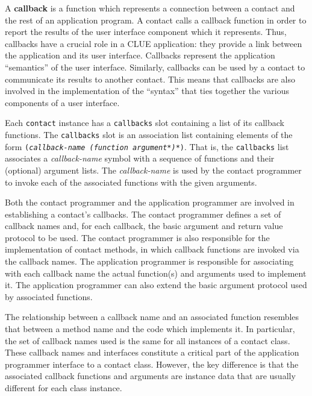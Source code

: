 
A {\bf callback} is a function which represents a connection
between a contact and the rest of an application program. A contact calls a
callback function in order to report the results of the user interface component
which it represents. Thus, callbacks have a crucial role in a CLUE application:
they provide a link between the application and its user interface. Callbacks
represent the application ``semantics'' of the user interface.
Similarly, callbacks can be used by a contact to communicate its results to
another contact. This means that callbacks are also involved in the
implementation of the ``syntax'' that ties together the various components of a
user interface. 

Each {\tt contact} instance has a {\tt callbacks} slot containing a list of its
callback functions.  The {\tt callbacks} slot is an association list containing
elements of the form 
{\tt ({\em callback-name (function argument*)*})}.
That is, the {\tt callbacks} list associates a {\em callback-name} symbol with a
sequence of functions and their (optional) argument lists.  The {\em
callback-name} is used by the contact programmer to invoke each of the
associated functions with the given arguments.

Both the contact programmer and the application programmer are involved in
establishing a contact's callbacks.  The contact programmer defines a set of
callback names and, for each callback, the basic argument and return value
protocol to be used.  The contact programmer is also responsible for the
implementation of contact methods, in which callback functions are invoked via
the callback names.  The application programmer is responsible for associating
with each callback name the actual function(s) and arguments used to implement
it. The application programmer can also extend the basic argument protocol used
by associated functions.

The relationship between a callback name and an associated function resembles
that between a method name and the code which implements it.  In particular, the
set of callback names used is the same for all instances of a contact class.
These callback names and interfaces constitute a critical part of the
application programmer interface to a contact class.
However, the key difference is that the associated callback functions and
arguments are instance data that are usually different for each class instance.

